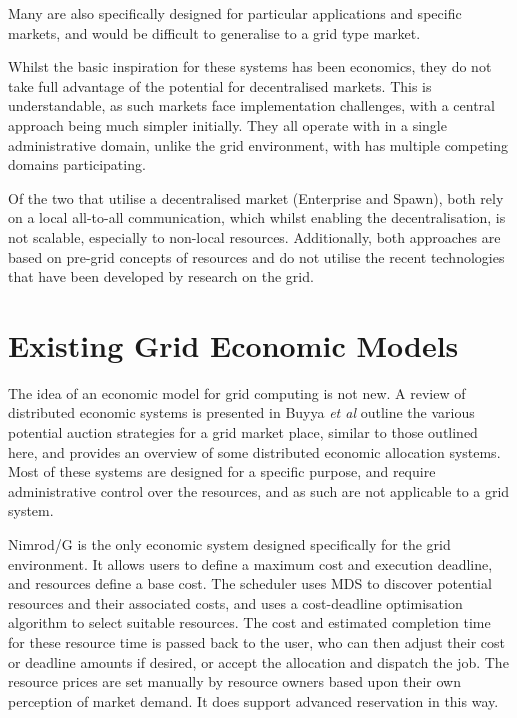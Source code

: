 Many are also specifically designed for particular applications and specific
markets, and would be difficult to generalise to a grid type market.

Whilst the basic inspiration for these systems has been economics, they do not
take full advantage of the potential for decentralised markets. This is
understandable, as such markets face implementation challenges, with a central
approach being much simpler initially. They all operate with in  a single
administrative domain, unlike the grid environment, with has multiple
competing domains participating. 

Of the two that utilise a decentralised market (Enterprise and Spawn), both
rely on a local all-to-all communication, which whilst enabling the
decentralisation, is not scalable, especially to non-local resources.
Additionally, both approaches are based on pre-grid concepts of resources and do
not utilise the recent technologies that have been developed by research on
the grid.


\section{Existing Grid Economic Models}
\label{SEC:ECON:GRIDECON}

The idea of an economic model for grid computing is not new. A review of
distributed economic systems is presented in\cite{grid-buyya02-economic} Buyya
\textit{et al} outline the various potential auction strategies for a grid
market place, similar to those outlined here, and provides an overview of some
distributed economic allocation systems. Most of these systems are designed for
a specific purpose, and require administrative control over the resources, and
as such are not applicable to a grid system. 

Nimrod/G \cite{grid-buyya00-nimrod-g}\cite{grid-abramson02-nimrod-g} is the only
economic system designed specifically for the grid environment.  It allows
users to define a maximum cost and execution deadline, and resources define a
base cost. The scheduler uses MDS to discover potential resources and their
associated costs, and uses a cost-deadline optimisation
algorithm\cite{grid-buyya02-dbc} to select suitable resources.  The cost and
estimated completion time for these resource time is passed back to the user,
who can then adjust their cost or deadline amounts if desired, or accept the
allocation and dispatch the job. The resource prices are set manually by
resource owners based upon their own perception of market demand. It does
support advanced reservation in this way.

